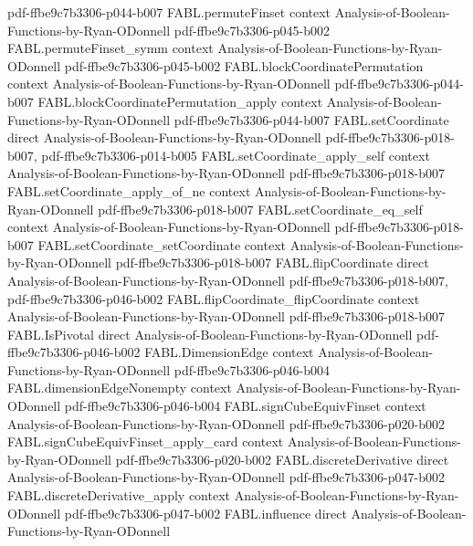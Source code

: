 \begin{theorem}
  {pdf-ffbe9c7b3306-p044-b007}
\proofstep
  {FABL.permuteFinset}
  {context}
  {Analysis-of-Boolean-Functions-by-Ryan-ODonnell}
  {pdf-ffbe9c7b3306-p045-b002}
\proofstep
  {FABL.permuteFinset_symm}
  {context}
  {Analysis-of-Boolean-Functions-by-Ryan-ODonnell}
  {pdf-ffbe9c7b3306-p045-b002}
\proofstep
  {FABL.blockCoordinatePermutation}
  {context}
  {Analysis-of-Boolean-Functions-by-Ryan-ODonnell}
  {pdf-ffbe9c7b3306-p044-b007}
\proofstep
  {FABL.blockCoordinatePermutation_apply}
  {context}
  {Analysis-of-Boolean-Functions-by-Ryan-ODonnell}
  {pdf-ffbe9c7b3306-p044-b007}
\proofstep
  {FABL.setCoordinate}
  {direct}
  {Analysis-of-Boolean-Functions-by-Ryan-ODonnell}
  {pdf-ffbe9c7b3306-p018-b007,
    pdf-ffbe9c7b3306-p014-b005}
\proofstep
  {FABL.setCoordinate_apply_self}
  {context}
  {Analysis-of-Boolean-Functions-by-Ryan-ODonnell}
  {pdf-ffbe9c7b3306-p018-b007}
\proofstep
  {FABL.setCoordinate_apply_of_ne}
  {context}
  {Analysis-of-Boolean-Functions-by-Ryan-ODonnell}
  {pdf-ffbe9c7b3306-p018-b007}
\proofstep
  {FABL.setCoordinate_eq_self}
  {context}
  {Analysis-of-Boolean-Functions-by-Ryan-ODonnell}
  {pdf-ffbe9c7b3306-p018-b007}
\proofstep
  {FABL.setCoordinate_setCoordinate}
  {context}
  {Analysis-of-Boolean-Functions-by-Ryan-ODonnell}
  {pdf-ffbe9c7b3306-p018-b007}
\proofstep
  {FABL.flipCoordinate}
  {direct}
  {Analysis-of-Boolean-Functions-by-Ryan-ODonnell}
  {pdf-ffbe9c7b3306-p018-b007,
    pdf-ffbe9c7b3306-p046-b002}
\proofstep
  {FABL.flipCoordinate_flipCoordinate}
  {context}
  {Analysis-of-Boolean-Functions-by-Ryan-ODonnell}
  {pdf-ffbe9c7b3306-p018-b007}
\proofstep
  {FABL.IsPivotal}
  {direct}
  {Analysis-of-Boolean-Functions-by-Ryan-ODonnell}
  {pdf-ffbe9c7b3306-p046-b002}
\proofstep
  {FABL.DimensionEdge}
  {context}
  {Analysis-of-Boolean-Functions-by-Ryan-ODonnell}
  {pdf-ffbe9c7b3306-p046-b004}
\proofstep
  {FABL.dimensionEdgeNonempty}
  {context}
  {Analysis-of-Boolean-Functions-by-Ryan-ODonnell}
  {pdf-ffbe9c7b3306-p046-b004}
\proofstep
  {FABL.signCubeEquivFinset}
  {context}
  {Analysis-of-Boolean-Functions-by-Ryan-ODonnell}
  {pdf-ffbe9c7b3306-p020-b002}
\proofstep
  {FABL.signCubeEquivFinset_apply_card}
  {context}
  {Analysis-of-Boolean-Functions-by-Ryan-ODonnell}
  {pdf-ffbe9c7b3306-p020-b002}
\proofstep
  {FABL.discreteDerivative}
  {direct}
  {Analysis-of-Boolean-Functions-by-Ryan-ODonnell}
  {pdf-ffbe9c7b3306-p047-b002}
\proofstep
  {FABL.discreteDerivative_apply}
  {context}
  {Analysis-of-Boolean-Functions-by-Ryan-ODonnell}
  {pdf-ffbe9c7b3306-p047-b002}
\proofstep
  {FABL.influence}
  {direct}
  {Analysis-of-Boolean-Functions-by-Ryan-ODonnell}

\end{theorem}
